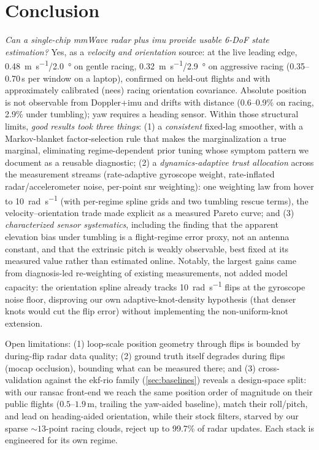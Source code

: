 \section{Conclusion}
\label{sec:conclusion}

\emph{Can a single-chip mmWave radar plus \ac{imu} provide usable 6-DoF
state estimation?}  Yes, as a \emph{velocity and orientation}
source: at the live leading edge,
\SI{0.48}{\metre\per\second}/\SI{2.0}{\degree} on gentle racing,
\SI{0.32}{\metre\per\second}/\SI{2.9}{\degree} on aggressive racing
(0.35--0.70\,s per window on a laptop), confirmed on held-out flights
and with approximately calibrated (\ac{nees}) racing orientation covariance.
Absolute position is not observable from Doppler+\ac{imu} and drifts with
distance (0.6--0.9\% on racing, 2.9\% under tumbling); yaw requires a
heading sensor.  Within those structural limits, \emph{good results
took three things}: (1) a \emph{consistent} fixed-lag smoother, with a
Markov-blanket factor-selection rule that makes the marginalization a
true marginal, eliminating regime-dependent prior tuning whose
symptom pattern we document as a reusable diagnostic;
(2) a \emph{dynamics-adaptive trust allocation} across the
measurement streams (rate-adaptive gyroscope weight, rate-inflated
radar/accelerometer noise, per-point \ac{snr} weighting): one weighting
law from hover to \SI{10}{\radian\per\second} (with per-regime spline grids
and two tumbling rescue terms), the velocity--orientation trade made
explicit as a measured Pareto curve;
and (3) \emph{characterized sensor systematics}, including the
finding that the apparent elevation bias under tumbling is a
flight-regime error proxy, not an antenna constant, and that the
extrinsic pitch is weakly observable, best fixed at its measured value
rather than estimated online.  Notably, the largest gains came from
diagnosis-led re-weighting of existing measurements, not added model
capacity: the orientation spline already tracks \SI{10}{\radian\per\second}
flips at the gyroscope noise floor, disproving our own adaptive-knot-density
hypothesis (that denser knots would cut the flip error) without implementing the non-uniform-knot extension.

Open limitations: (1) loop-scale position geometry through flips is
bounded by during-flip radar data quality; (2) ground truth itself degrades during flips
(\ac{mocap} occlusion), bounding what can be measured there; and
(3) cross-validation against the \ac{ekf}-\ac{rio} family
(\autoref{sec:baselines}) reveals a design-space split: with our
\ac{ransac} front-end we reach the same position order of magnitude on
their public flights ($0.5$--$1.9$\,m, trailing the yaw-aided baseline),
match their roll/pitch, and lead on heading-aided orientation, while their
stock filters, starved by our sparse ${\sim}13$-point racing clouds, reject
up to 99.7\% of radar updates.  Each stack is engineered for its own regime.

